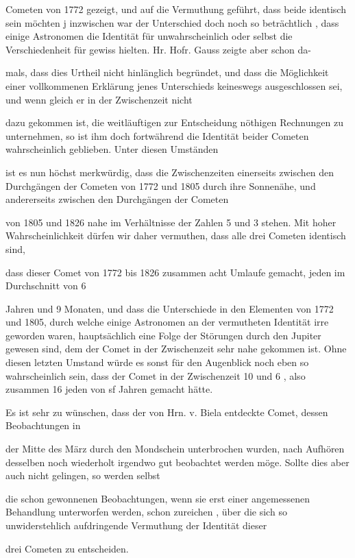 \documentclass[10pt,a4paper]{article}
\begin{document}
Cometen von 1772 gezeigt, und auf die Vermuthung geführt, dass beide identisch sein möchten j inzwischen war der Unterschied doch noch so beträchtlich , dass einige Astronomen die Identität für unwahrscheinlich oder selbst die Verschiedenheit für gewiss hielten. Hr. Hofr. Gauss zeigte aber schon da-

mals, dass dies Urtheil nicht hinlänglich begründet, und dass die Möglichkeit einer vollkommenen Erklärung jenes Unterschieds keineswegs ausgeschlossen sei, und wenn gleich er in der Zwischenzeit nicht

dazu gekommen ist, die weitläuftigen zur Entscheidung nöthigen Rechnungen zu unternehmen, so ist ihm doch fortwährend die Identität beider Cometen wahrscheinlich geblieben. Unter diesen Umständen

ist es nun höchst merkwürdig, dass die Zwischenzeiten einerseits zwischen den Durchgängen der Cometen von 1772 und 1805 durch ihre Sonnenähe, und andererseits zwischen den Durchgängen der Cometen

von 1805 und 1826 nahe im Verhältnisse der Zahlen 5 und 3 stehen. Mit hoher Wahrscheinlichkeit dürfen wir daher vermuthen, dass alle drei Cometen identisch sind,

dass dieser Comet von 1772 bis 1826 zusammen acht Umlaufe gemacht, jeden im Durchschnitt von 6

Jahren und 9 Monaten, und dass die Unterschiede in den Elementen von 1772 und 1805, durch welche einige Astronomen an der vermutheten Identität irre geworden waren, hauptsächlich eine Folge der Störungen durch den Jupiter gewesen sind, dem der Comet in der Zwischenzeit sehr nahe gekommen ist. Ohne diesen letzten Umstand würde es sonst für den Augenblick noch eben so wahrscheinlich sein, dass der Comet in der Zwischenzeit 10 und 6 , also zusammen 16 jeden von sf Jahren gemacht hätte.

Es ist sehr zu wünschen, dass der von Hrn. v. Biela entdeckte Comet, dessen Beobachtungen in

der Mitte des März durch den Mondschein unterbrochen wurden, nach Aufhören desselben noch wiederholt irgendwo gut beobachtet werden möge. Sollte dies aber auch nicht gelingen, so werden selbst

die schon gewonnenen Beobachtungen, wenn sie erst einer angemessenen Behandlung unterworfen werden, schon zureichen , über die sich so unwiderstehlich aufdringende Vermuthung der Identität dieser

drei Cometen zu entscheiden.
\end{document}
